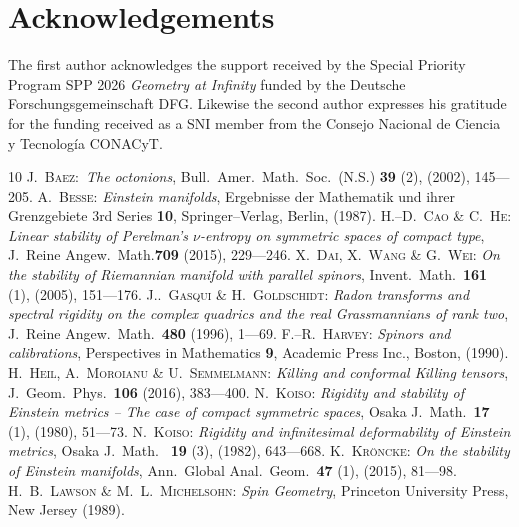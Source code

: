 \documentclass[12pt]{article}
\begin{document}
\section*{Acknowledgements}
%
 The first author acknowledges the support received by the Special Priority
 Program SPP 2026 {\em Geometry at Infinity} funded by the Deutsche
 Forschungsgemeinschaft DFG. Likewise the second author expresses his
 gratitude for the funding received as a SNI member from the Consejo
 Nacional de Ciencia y Tecnolog\'ia CONACyT.
%
\begin{thebibliography}{10}
%
 \textsc{J.~Baez:}\ 
 \textit{The octonions},
 \textrm{Bull.~Amer.~Math.~Soc.~(N.S.) \textbf{39} (2), (2002), 145---205.}
 \textsc{A.~Besse:}\quad
 \textit{Einstein manifolds},\quad 
 \textrm{Ergebnisse der Mathematik und ihrer Grenzgebiete
  3rd Series \textbf{10}, Springer--Verlag, Berlin, (1987).}
%
 \textsc{H.--D.~Cao \& C.~He:}\quad
 \textit{Linear stability of Perelman's $\nu$-entropy on
  symmetric spaces of compact type},\quad 
 \textrm{J.~Reine Angew.~Math.\textbf{709} (2015), 229---246.} 
%
 \textsc{X.~Dai, X.~Wang \& G.~Wei:}\quad
 \textit{On the stability of Riemannian manifold with parallel spinors},\quad
 \textrm{Invent.~Math.~\textbf{161} (1), (2005), 151---176.} 
%
 \textsc{J..~Gasqui \& H.~Goldschidt:}\quad
 \textit{Radon transforms and spectral rigidity on the complex quadrics
  and the real Grassmannians of rank two},\quad
 \textrm{ J.~Reine Angew.~Math.~\textbf{480} (1996), 1---69.}
%
\textsc{F.--R.~Harvey:}\quad
\textit{Spinors and calibrations},\quad
\textrm{Perspectives in Mathematics \textbf{9},
 Academic Press Inc., Boston, (1990).}
%
\textsc{H.~Heil, A.~Moroianu \& U.~Semmelmann:}\quad
\textit{Killing and conformal Killing tensors},\quad
\textrm{J.~Geom.~Phys.~\textbf{106} (2016), 383---400.}
%
 \textsc{N.~Koiso:}\quad
 \textit{Rigidity and stability of Einstein metrics
  -- The case of compact symmetric spaces},\quad
 \textrm{Osaka J.~Math.~\textbf{17} (1), (1980), 51---73.} 
%
 \textsc{N.~Koiso:}\quad
 \textit{Rigidity and infinitesimal deformability of Einstein metrics},\quad
 \textrm{Osaka J.~Math.~ \textbf{19} (3), (1982), 643---668.} 
%
 \textsc{K.~Kröncke:}\quad
 \textit{On the stability of Einstein manifolds},\quad
 \textrm{Ann.~Global Anal.~Geom.~\textbf{47} (1), (2015), 81---98.}
%
 \textsc{H.~B.~Lawson \& M.~L.~Michelsohn:}\quad
 \textit{Spin Geometry},\quad
 \textrm{Princeton University Press, New Jersey (1989).} 

\end{thebibliography}
\end{document}
